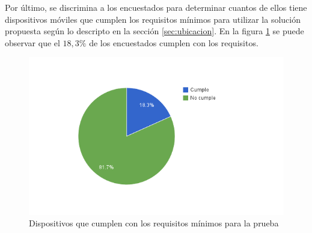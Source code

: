 Por último, se discrimina a los encuestados para determinar cuantos de ellos tiene dispositivos
móviles que cumplen los requisitos mínimos para utilizar la solución propuesta según lo descripto
en la sección \ref{sec:ubicacion}. En la figura \ref{fig:ubicacion_requisitos_minimos} se puede 
observar que el $18,3\%$ de los encuestados cumplen con los requisitos.

\begin{figure}[ht!]
\centering
\includegraphics[scale=0.8]{resultados/imagenes/ubicacion_requisitos_minimos.png}
\caption{Dispositivos que cumplen con los requisitos mínimos para la prueba}
\label{fig:ubicacion_requisitos_minimos}
\end{figure}